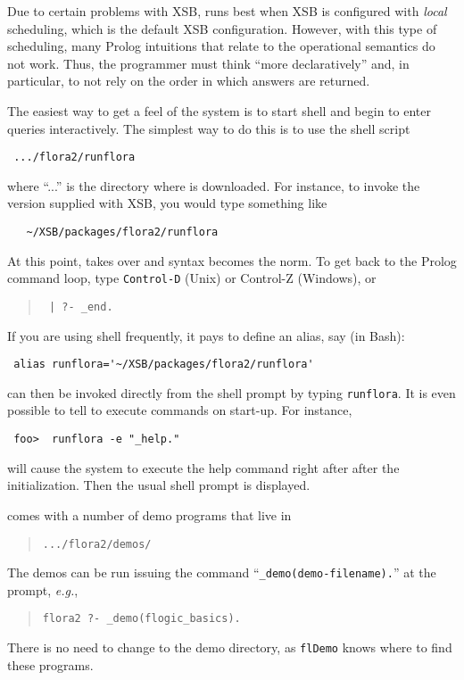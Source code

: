 Due to certain problems with XSB, \FLORA runs best when XSB is configured
with \emph{local} scheduling, which is the default XSB configuration.
However, with this type of scheduling, many Prolog intuitions that relate
to the operational semantics do not work. Thus, the programmer must think
``more declaratively'' and, in particular, to not rely on the 
order in which answers are returned.


\label{runflora-page}
The easiest way to get a feel of the system
is to start \FLORA shell and begin to enter queries interactively.
The simplest way to do this is to use the shell script
\begin{verbatim}
 .../flora2/runflora  
\end{verbatim}
where ``...'' is the directory where \FLORA is downloaded. For instance, to
invoke the version supplied with XSB, you would type something like
\begin{verbatim}
   ~/XSB/packages/flora2/runflora
\end{verbatim}

At this point, \FLORA takes over and \fl syntax becomes the
norm. To get back to the Prolog command loop, type {\tt Control-D} 
(Unix) or Control-Z (Windows), or 
\begin{quote}
  \tt
| ?- \_end.  
\end{quote}

\noindent
If you are using \FLORA shell frequently, it pays to define an alias, say
(in Bash):
\begin{verbatim}
 alias runflora='~/XSB/packages/flora2/runflora'
\end{verbatim}
\FLORA can then be invoked directly from the shell prompt by typing
{\tt runflora}. 
It is even possible to tell \FLORA to execute commands on start-up.
For instance, 
\begin{verbatim}
 foo>  runflora -e "_help."
\end{verbatim}
will cause the system to execute the help command right after after the
initialization. Then the usual \FLORA shell prompt is displayed.

\noindent
\FLORA comes with a number of demo programs that live in
\begin{quote}
 \verb|.../flora2/demos/|  
\end{quote}
The demos can be run issuing the command
``\verb|_demo(demo-filename).|''
at the \FLORA prompt, {\it e.g.},
\begin{quote}
 \verb|flora2 ?- _demo(flogic_basics).|
\end{quote}
There is no need to change to the demo directory, as {\tt flDemo} knows
where to find these programs.


